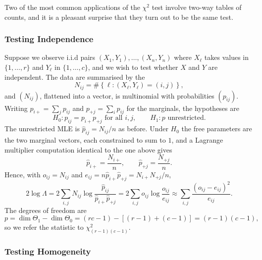 \documentclass[a4paper]{scrartcl}
\begin{document}
Two of the most common applications of the $\chi^2$ test involve two-way tables of counts, and it is a pleasant surprise that they turn out to be the same test.

\subsubsection{Testing Independence}

Suppose we observe i.i.d pairs $(X_1,Y_1),\dots,(X_n,Y_n)$ where $X_\ell$ takes values in $\{1,\dots,r\}$ and $Y_\ell$ in $\{1,\dots,c\}$, and we wish to test whether $X$ and $Y$ are independent. The data are summarised by the 
$$
N_{ij} = \#\left\{\ell : (X_\ell,Y_\ell) = (i,j)\right\},
$$
and $(N_{ij})$, flattened into a vector, is multinomial with probabilities $(p_{ij})$. Writing $p_{i+} = \sum_j p_{ij}$ and $p_{+j} = \sum_i p_{ij}$ for the marginals, the hypotheses are
$$
H_0 : p_{ij} = p_{i+}p_{+j} \text{ for all } i,j, \qquad H_1 : p \text{ unrestricted}.
$$
The unrestricted MLE is $\hat p_{ij} = N_{ij}/n$ as before. Under $H_0$ the free parameters are the two marginal vectors, each constrained to sum to $1$, and a Lagrange multiplier computation identical to the one above gives
$$
\hat p_{i+} = \frac{N_{i+}}{n}, \qquad \hat p_{+j} = \frac{N_{+j}}{n}.
$$
Hence, with $o_{ij} = N_{ij}$ and $e_{ij} = n\hat p_{i+}\hat p_{+j} = N_{i+}N_{+j}/n$,
$$
2\log\Lambda = 2\sum_{i,j}N_{ij}\log\frac{\hat p_{ij}}{\hat p_{i+}\hat p_{+j}} = 2\sum_{i,j}o_{ij}\log\frac{o_{ij}}{e_{ij}} \approx \sum_{i,j}\frac{(o_{ij}-e_{ij})^2}{e_{ij}}.
$$
The degrees of freedom are
$$
p = \dim\Theta_1 - \dim\Theta_0 = (rc - 1) - \left[(r-1)+(c-1)\right] = (r-1)(c-1),
$$
so we refer the statistic to $\chi^2_{(r-1)(c-1)}$.

\subsubsection{Testing Homogeneity}
\end{document}
